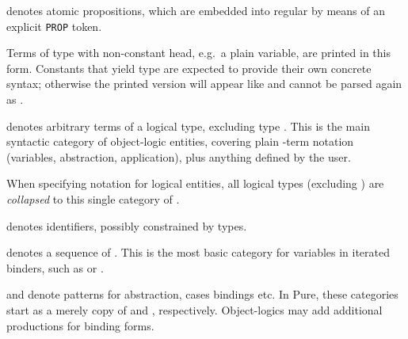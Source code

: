 \begin{isabellebody}
\begin{isamarkuptext}
\begin{description}
  \item {}\hyperlink{syntax.inner.aprop}{\mbox{}} denotes atomic propositions, which
  are embedded into regular \hyperlink{syntax.inner.prop}{\mbox{}} by means of an
  explicit \verb|PROP| token.

  Terms of type  with non-constant head, e.g.\ a plain
  variable, are printed in this form.  Constants that yield type  are expected to provide their own concrete syntax; otherwise
  the printed version will appear like \hyperlink{syntax.inner.logic}{\mbox{}} and
  cannot be parsed again as \hyperlink{syntax.inner.prop}{\mbox{}}.

  \item {}\hyperlink{syntax.inner.logic}{\mbox{}} denotes arbitrary terms of a
  logical type, excluding type .  This is the main
  syntactic category of object-logic entities, covering plain -term notation (variables, abstraction, application), plus
  anything defined by the user.

  When specifying notation for logical entities, all logical types
  (excluding ) are \emph{collapsed} to this single category
  of \hyperlink{syntax.inner.logic}{\mbox{}}.

  \item {}\hyperlink{syntax.inner.idt}{\mbox{}} denotes identifiers, possibly
  constrained by types.

  \item {}\hyperlink{syntax.inner.idts}{\mbox{}} denotes a sequence of \hyperlink{syntax.inner.idt}{\mbox{}}.  This is the most basic category for variables in
  iterated binders, such as  or .

  \item {}\hyperlink{syntax.inner.pttrn}{\mbox{}} and \hyperlink{syntax.inner.pttrns}{\mbox{}}
  denote patterns for abstraction, cases bindings etc.  In Pure, these
  categories start as a merely copy of \hyperlink{syntax.inner.idt}{\mbox{}} and
  \hyperlink{syntax.inner.idts}{\mbox{}}, respectively.  Object-logics may add
  additional productions for binding forms.


\end{description}
\end{isamarkuptext}
\end{isabellebody}
